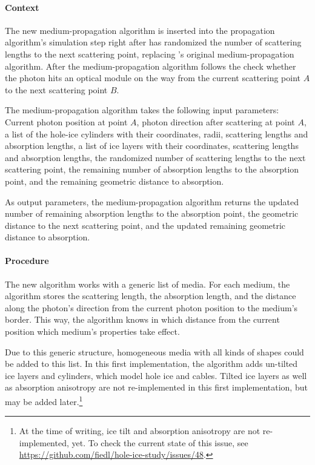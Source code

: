 \paragraph{Context}
The new medium-propagation algorithm is inserted into the \clsim propagation algorithm's simulation step right after \clsim has randomized the number of scattering lengths to the next scattering point, replacing \clsim's original medium-propagation algorithm. After the medium-propagation algorithm follows the check whether the photon hits an optical module on the way from the current scattering point $A$ to the next scattering point $B$.

The medium-propagation algorithm takes the following input parameters: Current photon position at point $A$, photon direction after scattering at point $A$, a list of the hole-ice cylinders with their coordinates, radii, scattering lengths and absorption lengths, a list of ice layers with their coordinates, scattering lengths and absorption lengths, the randomized number of scattering lengths to the next scattering point, the remaining number of absorption lengths to the absorption point, and the remaining geometric distance to absorption.

As output parameters, the medium-propagation algorithm returns the updated number of remaining absorption lengths to the absorption point, the geometric distance to the next scattering point, and the updated remaining geometric distance to absorption.

\paragraph{Procedure}
The new algorithm works with a generic list of media. For each medium, the algorithm stores the scattering length, the absorption length, and the distance along the photon's direction from the current photon position to the medium's border. This way, the algorithm knows in which distance from the current position which medium's properties take effect.

Due to this generic structure, homogeneous media with all kinds of shapes could be added to this list. In this first implementation, the algorithm adds un-tilted ice layers and cylinders, which model hole ice and cables. Tilted ice layers as well as absorption anisotropy are not re-implemented in this first implementation, but may be added later.\footnote{At the time of writing, ice tilt and absorption anisotropy are not re-implemented, yet. To check the current state of this issue, see \url{https://github.com/fiedl/hole-ice-study/issues/48}.}

